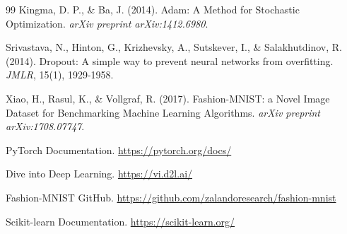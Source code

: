 \documentclass[12pt,a4paper]{article}
\begin{document}
\begin{thebibliography}{99}
Kingma, D. P., \& Ba, J. (2014). Adam: A Method for Stochastic Optimization. \textit{arXiv preprint arXiv:1412.6980}.

Srivastava, N., Hinton, G., Krizhevsky, A., Sutskever, I., \& Salakhutdinov, R. (2014). Dropout: A simple way to prevent neural networks from overfitting. \textit{JMLR}, 15(1), 1929-1958.

Xiao, H., Rasul, K., \& Vollgraf, R. (2017). Fashion-MNIST: a Novel Image Dataset for Benchmarking Machine Learning Algorithms. \textit{arXiv preprint arXiv:1708.07747}.

PyTorch Documentation. \url{https://pytorch.org/docs/}

Dive into Deep Learning. \url{https://vi.d2l.ai/}

Fashion-MNIST GitHub. \url{https://github.com/zalandoresearch/fashion-mnist}

Scikit-learn Documentation. \url{https://scikit-learn.org/}

\end{thebibliography}
\end{document}
